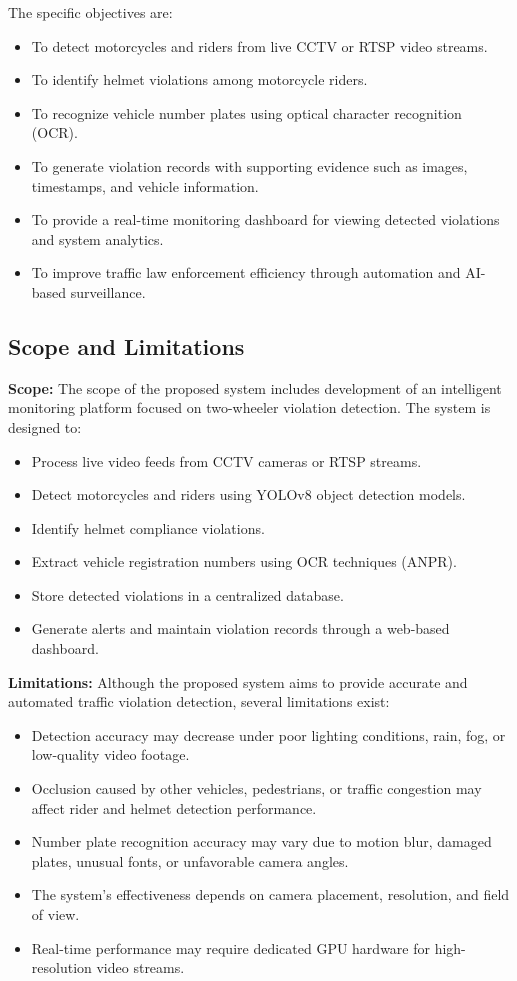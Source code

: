 \documentclass[12pt,a4paper]{article}
\begin{document}
The specific objectives are:
\begin{itemize}
  \item To detect motorcycles and riders from live CCTV or RTSP video streams.
  \item To identify helmet violations among motorcycle riders.
  \item To recognize vehicle number plates using optical character recognition (OCR).
  \item To generate violation records with supporting evidence such as images, timestamps, and vehicle information.
  \item To provide a real-time monitoring dashboard for viewing detected violations and system analytics.
  \item To improve traffic law enforcement efficiency through automation and AI-based surveillance.
\end{itemize}

\subsection{Scope and Limitations}
\textbf{Scope:} The scope of the proposed system includes development of an intelligent monitoring platform focused on two-wheeler violation detection. The system is designed to:
\begin{itemize}
  \item Process live video feeds from CCTV cameras or RTSP streams.
  \item Detect motorcycles and riders using YOLOv8 object detection models.
  \item Identify helmet compliance violations.
  \item Extract vehicle registration numbers using OCR techniques (ANPR).
  \item Store detected violations in a centralized database.
  \item Generate alerts and maintain violation records through a web-based dashboard.
\end{itemize}

\textbf{Limitations:} Although the proposed system aims to provide accurate and automated traffic violation detection, several limitations exist:
\begin{itemize}
  \item Detection accuracy may decrease under poor lighting conditions, rain, fog, or low-quality video footage.
  \item Occlusion caused by other vehicles, pedestrians, or traffic congestion may affect rider and helmet detection performance.
  \item Number plate recognition accuracy may vary due to motion blur, damaged plates, unusual fonts, or unfavorable camera angles.
  \item The system's effectiveness depends on camera placement, resolution, and field of view.
  \item Real-time performance may require dedicated GPU hardware for high-resolution video streams.
\end{itemize}
\end{document}
